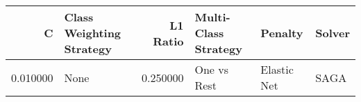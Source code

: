 \begin{tabular}{rlrlll}
\toprule
C & Class Weighting Strategy & L1 Ratio & Multi-Class Strategy & Penalty & Solver \\
\midrule
0.010000 & None & 0.250000 & One vs Rest & Elastic Net & SAGA \\
\bottomrule
\end{tabular}
